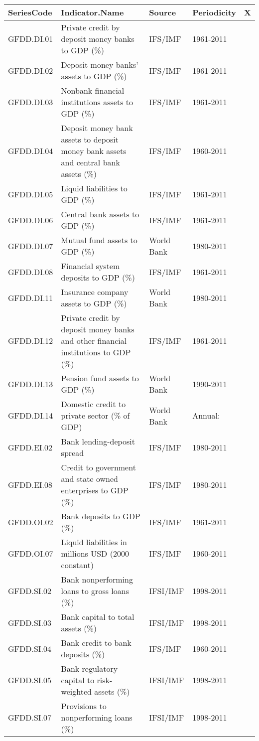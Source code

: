 {\scriptsize
\begin{tabular}{lllll}
  \hline
SeriesCode & Indicator.Name & Source & Periodicity & X \\ 
  \hline
GFDD.DI.01 & Private credit by deposit money banks to GDP (\%) & IFS/IMF & 1961-2011 &  \\ 
  GFDD.DI.02 & Deposit money banks' assets to GDP (\%) & IFS/IMF & 1961-2011 &  \\ 
  GFDD.DI.03 & Nonbank financial institutions assets to GDP (\%) & IFS/IMF & 1961-2011 &  \\ 
  GFDD.DI.04 & Deposit money bank assets to deposit money bank assets and central bank assets (\%) & IFS/IMF & 1960-2011 &  \\ 
  GFDD.DI.05 & Liquid liabilities to GDP (\%) & IFS/IMF & 1961-2011 &  \\ 
  GFDD.DI.06 & Central bank assets to GDP (\%) & IFS/IMF & 1961-2011 &  \\ 
  GFDD.DI.07 & Mutual fund assets to GDP (\%) & World Bank & 1980-2011 &  \\ 
  GFDD.DI.08 & Financial system deposits to GDP (\%) & IFS/IMF & 1961-2011 &  \\ 
  GFDD.DI.11 & Insurance company assets to GDP (\%) & World Bank & 1980-2011 &  \\ 
  GFDD.DI.12 & Private credit by deposit money banks and other financial institutions to GDP (\%) & IFS/IMF & 1961-2011 &  \\ 
  GFDD.DI.13 & Pension fund assets to GDP (\%) & World Bank & 1990-2011 &  \\ 
  GFDD.DI.14 & Domestic credit to private sector (\% of GDP) & World Bank & Annual: &  \\ 
  GFDD.EI.02 & Bank lending-deposit spread & IFS/IMF & 1980-2011 &  \\ 
  GFDD.EI.08 & Credit to government and state owned enterprises to GDP (\%) & IFS/IMF & 1980-2011 &  \\ 
  GFDD.OI.02 & Bank deposits to GDP (\%) & IFS/IMF & 1961-2011 &  \\ 
  GFDD.OI.07 & Liquid liabilities in millions USD (2000 constant) & IFS/IMF & 1960-2011 &  \\ 
  GFDD.SI.02 & Bank nonperforming loans to gross loans (\%) & IFSI/IMF & 1998-2011 &  \\ 
  GFDD.SI.03 & Bank capital to total assets (\%) & IFSI/IMF & 1998-2011 &  \\ 
  GFDD.SI.04 & Bank credit to bank deposits (\%) & IFS/IMF & 1960-2011 &  \\ 
  GFDD.SI.05 & Bank regulatory capital to risk-weighted assets (\%) & IFSI/IMF & 1998-2011 &  \\ 
  GFDD.SI.07 & Provisions to nonperforming loans (\%) & IFSI/IMF & 1998-2011 &  \\ 
   \hline
\end{tabular}
}
